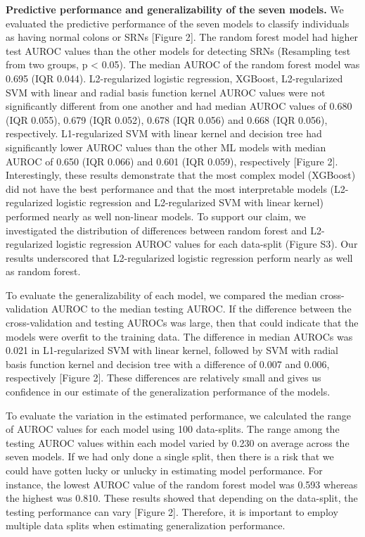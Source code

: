\documentclass[11pt,]{article}
\begin{document}
\textbf{Predictive performance and generalizability of the seven
models.} We evaluated the predictive performance of the seven models to
classify individuals as having normal colons or SRNs {[}Figure 2{]}. The
random forest model had higher test AUROC values than the other models
for detecting SRNs (Resampling test from two groups, p \textless{}
0.05). The median AUROC of the random forest model was 0.695 (IQR
0.044). L2-regularized logistic regression, XGBoost, L2-regularized SVM
with linear and radial basis function kernel AUROC values were not
significantly different from one another and had median AUROC values of
0.680 (IQR 0.055), 0.679 (IQR 0.052), 0.678 (IQR 0.056) and 0.668 (IQR
0.056), respectively. L1-regularized SVM with linear kernel and decision
tree had significantly lower AUROC values than the other ML models with
median AUROC of 0.650 (IQR 0.066) and 0.601 (IQR 0.059), respectively
{[}Figure 2{]}. Interestingly, these results demonstrate that the most
complex model (XGBoost) did not have the best performance and that the
most interpretable models (L2-regularized logistic regression and
L2-regularized SVM with linear kernel) performed nearly as well
non-linear models. To support our claim, we investigated the
distribution of differences between random forest and L2-regularized
logistic regression AUROC values for each data-split (Figure S3). Our
results underscored that L2-regularized logistic regression perform
nearly as well as random forest.

To evaluate the generalizability of each model, we compared the median
cross-validation AUROC to the median testing AUROC. If the difference
between the cross-validation and testing AUROCs was large, then that
could indicate that the models were overfit to the training data. The
difference in median AUROCs was 0.021 in L1-regularized SVM with linear
kernel, followed by SVM with radial basis function kernel and decision
tree with a difference of 0.007 and 0.006, respectively {[}Figure 2{]}.
These differences are relatively small and gives us confidence in our
estimate of the generalization performance of the models.

To evaluate the variation in the estimated performance, we calculated
the range of AUROC values for each model using 100 data-splits. The
range among the testing AUROC values within each model varied by 0.230
on average across the seven models. If we had only done a single split,
then there is a risk that we could have gotten lucky or unlucky in
estimating model performance. For instance, the lowest AUROC value of
the random forest model was 0.593 whereas the highest was 0.810. These
results showed that depending on the data-split, the testing performance
can vary {[}Figure 2{]}. Therefore, it is important to employ multiple
data splits when estimating generalization performance.
\end{document}
